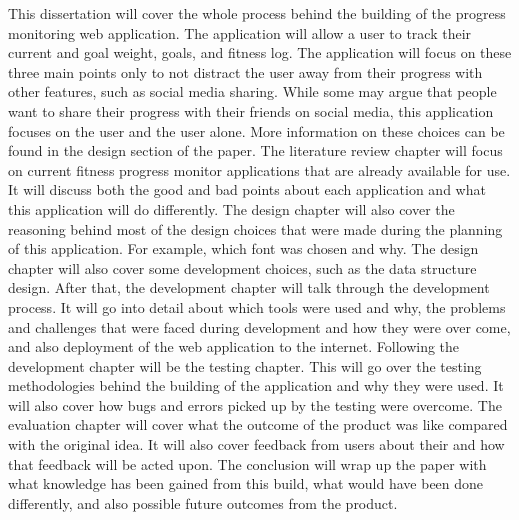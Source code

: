 This dissertation will cover the whole process behind the building of the progress monitoring web application. The application will allow a user to track their current and goal weight, goals, and fitness log. The application will focus on these three main points only to not distract the user away from their progress with other features, such as social media sharing. While some may argue that people want to share their progress with their friends on social media, this application focuses on the user and the user alone. More information on these choices can be found in the design section of the paper. The literature review chapter will focus on current fitness progress monitor applications that are already available for use. It will discuss both the good and bad points about each application and what this application will do differently. The design chapter will also cover the reasoning behind most of the design choices that were made during the planning of this application. For example, which font was chosen and why. The design chapter will also cover some development choices, such as the data structure design. After that, the development chapter will talk through the development process. It will go into detail about which tools were used and why, the problems and challenges that were faced during development and how they were over come, and also deployment of the web application to the internet. Following the development chapter will be the testing chapter. This will go over the testing methodologies behind the building of the application and why they were used. It will also cover how bugs and errors picked up by the testing were overcome. The evaluation chapter will cover what the outcome of the product was like compared with the original idea. It will also cover feedback from users about their and how that feedback will be acted upon. The conclusion will wrap up the paper with what knowledge has been gained from this build, what would have been done differently, and also possible future outcomes from the product. 